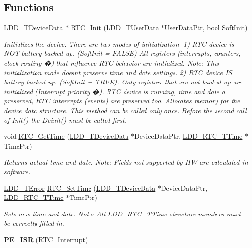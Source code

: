 \subsection*{Functions}
\begin{DoxyCompactItemize}
\item 
\hyperlink{group___p_e___types__module_gac5cf1362f1f0e3a2ce71b1bf2276d091}{L\+D\+D\+\_\+\+T\+Device\+Data} $\ast$ \hyperlink{group___r_t_c__module_ga8493e21872f656aa30a9e13b522aa1cb}{R\+T\+C\+\_\+\+Init} (\hyperlink{group___p_e___types__module_ga0b66a73f87238a782318aa0be7578e35}{L\+D\+D\+\_\+\+T\+User\+Data} $\ast$User\+Data\+Ptr, bool Soft\+Init)
\begin{DoxyCompactList}\small\item\em Initializes the device. There are two modes of initialization. 1) R\+TC device is N\+OT battery backed up. (Soft\+Init = F\+A\+L\+SE) All registers (interrupts, counters, clock routing �) that influence R\+TC behavior are initialized. Note\+: This initialization mode doesn\textquotesingle{}t preserve time and date settings. 2) R\+TC device IS battery backed up. (Soft\+Init = T\+R\+UE). Only registers that are not backed up are initialized (Interrupt priority �). R\+TC device is running, time and date a preserved, R\+TC interrupts (events) are preserved too. Allocates memory for the device data structure. This method can be called only once. Before the second call of Init() the Deinit() must be called first. \end{DoxyCompactList}\item 
void \hyperlink{group___r_t_c__module_gae7aa19d663f150815eba0a2738ef22fb}{R\+T\+C\+\_\+\+Get\+Time} (\hyperlink{group___p_e___types__module_gac5cf1362f1f0e3a2ce71b1bf2276d091}{L\+D\+D\+\_\+\+T\+Device\+Data} $\ast$Device\+Data\+Ptr, \hyperlink{struct_l_d_d___r_t_c___t_time}{L\+D\+D\+\_\+\+R\+T\+C\+\_\+\+T\+Time} $\ast$Time\+Ptr)
\begin{DoxyCompactList}\small\item\em Returns actual time and date. Note\+: Fields not supported by HW are calculated in software. \end{DoxyCompactList}\item 
\hyperlink{group___p_e___types__module_ga24c2b045fd04e79e85f261ce4df35588}{L\+D\+D\+\_\+\+T\+Error} \hyperlink{group___r_t_c__module_gaa23aacdc2ac44dbcb0b4efeb7e394b8b}{R\+T\+C\+\_\+\+Set\+Time} (\hyperlink{group___p_e___types__module_gac5cf1362f1f0e3a2ce71b1bf2276d091}{L\+D\+D\+\_\+\+T\+Device\+Data} $\ast$Device\+Data\+Ptr, \hyperlink{struct_l_d_d___r_t_c___t_time}{L\+D\+D\+\_\+\+R\+T\+C\+\_\+\+T\+Time} $\ast$Time\+Ptr)
\begin{DoxyCompactList}\small\item\em Sets new time and date. Note\+: All \hyperlink{struct_l_d_d___r_t_c___t_time}{L\+D\+D\+\_\+\+R\+T\+C\+\_\+\+T\+Time} structure members must be correctly filled in. \end{DoxyCompactList}\item 
\mbox{\label{group___r_t_c__module_ga2e6ed2e93351f9d909d9a9daa2840735}} 
{\bfseries P\+E\+\_\+\+I\+SR} (R\+T\+C\+\_\+\+Interrupt)
\end{DoxyCompactItemize}


